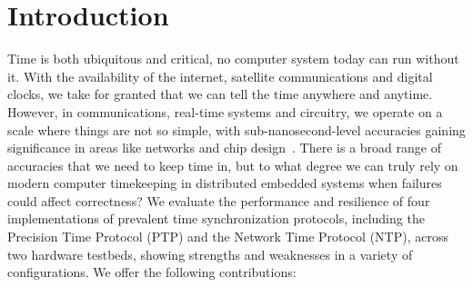 
\section{Introduction}

Time is both ubiquitous and critical, no computer system today can run without it. With the availability of the internet, satellite communications and digital clocks, we take for granted that we can tell the time anywhere and anytime.
%
However, in communications, real-time systems and circuitry, we operate on a scale where things are not so simple, with sub-nanosecond-level accuracies gaining significance in areas like networks and chip design~\cite{nanopu,sub-nanosecond-comms-design}.
There is a broad range of accuracies that we need to keep time in, but to what degree we can truly rely on modern   computer timekeeping in distributed embedded systems when failures could affect correctness?
We evaluate the performance and resilience of four implementations of prevalent time synchronization protocols, including the Precision Time Protocol (PTP) and the Network Time Protocol (NTP), across two hardware testbeds, showing strengths and weaknesses in a variety of configurations. We offer the following contributions:

